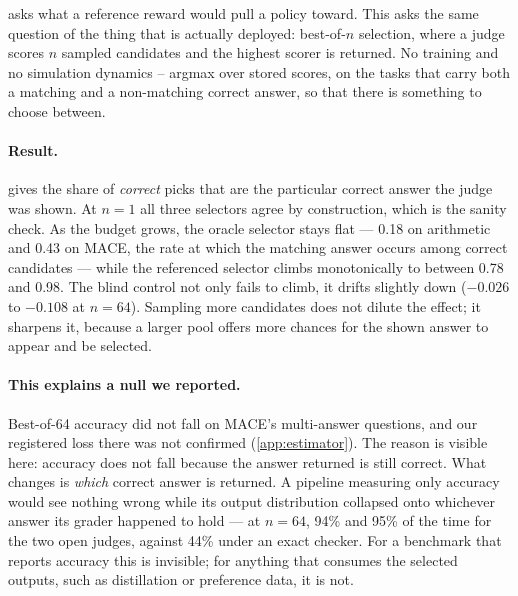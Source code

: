  asks what a reference reward would pull a policy toward. This asks the same
question of the thing that is actually deployed: best-of-$n$ selection, where a judge scores $n$
sampled candidates and the highest scorer is returned. No training and no simulation dynamics --
argmax over stored scores, on the tasks that carry both a matching and a non-matching correct
answer, so that there is something to choose between.\ph{}

\paragraph{Result.}  gives the share of \emph{correct} picks that are the
particular correct answer the judge was shown. At $n=1$ all three selectors agree by construction,
which is the sanity check. As the budget grows, the oracle selector stays flat --- 0.18 on
arithmetic and 0.43 on \textsc{MACE}, the rate at which the matching answer occurs among correct
candidates --- while the referenced selector climbs monotonically to between 0.78 and 0.98. The
blind control not only fails to climb, it drifts slightly down ($-0.026$ to $-0.108$ at $n=64$).
Sampling more candidates does not dilute the effect; it sharpens it, because a larger pool offers
more chances for the shown answer to appear and be selected.

\paragraph{This explains a null we reported.} Best-of-64 accuracy did not fall on \textsc{MACE}'s
multi-answer questions, and our registered loss there was not confirmed (\cref{app:estimator}). The
reason is visible here: accuracy does not fall because the answer returned is still correct. What
changes is \emph{which} correct answer is returned. A pipeline measuring only accuracy would see
nothing wrong while its output distribution collapsed onto whichever answer its grader happened to
hold --- at $n=64$, 94\% and 95\% of the time for the two open judges, against 44\% under an exact
checker. For a benchmark that reports accuracy this is invisible; for anything that consumes the
selected outputs, such as distillation or preference data, it is not.

